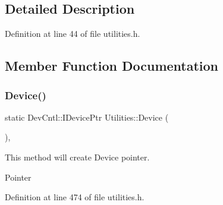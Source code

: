\subsection{Detailed Description}


Definition at line 44 of file utilities.\+h.



\subsection{Member Function Documentation}
\mbox{\label{class_utilities_aebdda516a1576b1ad42b841d5eac817c_aebdda516a1576b1ad42b841d5eac817c}} 
\subsubsection{\texorpdfstring{Device()}{Device()}}
{\footnotesize\ttfamily static Dev\+Cntl\+::\+I\+Device\+Ptr Utilities\+::\+Device (\begin{DoxyParamCaption}{ }\end{DoxyParamCaption})\hspace{0.3cm}{\ttfamily [inline]}, {\ttfamily [static]}}

This method will create Device pointer.

Pointer 

Definition at line 474 of file utilities.\+h.


